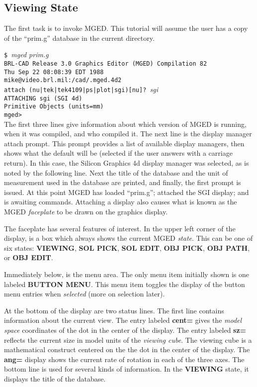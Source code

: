 \subsection{Viewing State}

The first task is to invoke MGED.  This tutorial will assume the user
has a copy of the ``prim.g'' database in the current directory.

\noindent
{\tt \$ }{\em mged prim.g}\\
{\tt BRL-CAD Release 3.0 Graphics Editor (MGED) Compilation 82}\\
{\tt Thu Sep 22 08:08:39 EDT 1988}\\
{\tt mike@video.brl.mil:/cad/.mged.4d2}\\

\noindent
{\tt attach (nu|tek|tek4109|ps|plot|sgi)[nu]? }{\em sgi}\\
{\tt ATTACHING sgi (SGI 4d)}\\
{\tt Primitive Objects (units=mm)}\\
{\tt mged> }\\

The first three lines give information about which version of MGED is running,
when it was compiled, and who compiled it.  The next line is the display
manager attach prompt.  This prompt provides a list of available display
managers, then shows what the default will be (selected if the user answers
with a carriage return).  In this case, the Silicon Graphics 4d display
manager was selected, as is noted by the following line.
Next the title of the database and
the unit of measurement used in the database are printed,
and finally, the first prompt is issued.
At this point MGED has loaded ``prim.g''; attached the SGI display;
and is awaiting commands.  Attaching a display also causes what
is known as the MGED {\sl faceplate} to be drawn on the graphics display.

The faceplate has several features of interest.  In the upper left corner
of the display, is a box which always shows the current MGED {\sl state}.
This can be one of six states:  {\bf VIEWING}, {\bf SOL PICK},
{\bf SOL EDIT}, {\bf OBJ PICK}, {\bf OBJ PATH}, or {\bf OBJ EDIT}.

Immediately below, is the menu area.  The only menu item initially shown is
one labeled {\bf BUTTON MENU}.  This menu item toggles the display of the
button menu entries when {\sl selected} (more on selection later).

At the bottom of the display are two status lines.  The first line
contains information about the current view.
The entry labeled {\bf cent=} gives the {\sl model space} coordinates
of the dot in the center of the display.
The entry labeled {\bf sz=} reflects the current size in model units of
the {\sl viewing cube}.  The viewing cube is a mathematical construct
centered on the the dot in the center of the display.  The {\bf ang=}
display shows the current rate of rotation in each of the three axes.
The bottom line is used for several kinds of information.
In the {\bf VIEWING} state, it displays the title of the database.

